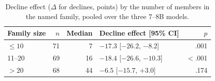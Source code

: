 \begin{table}[t]
\centering
\footnotesize
\setlength{\tabcolsep}{3pt}
\begin{tabular}{@{}lrrlr@{}}
\toprule
Family size & $n$ & Median & Decline effect [95\% CI] & $p$ \\
\midrule
$\le 10$ & 71 & 7 & $-17.3$ [$-26.2$, $-8.2$] & .001 \\
11--20 & 69 & 16 & $-18.4$ [$-26.6$, $-10.3$] & $<$.001 \\
$>20$ & 68 & 44 & $-6.5$ [$-15.7$, $+3.0$] & .174 \\
\bottomrule
\end{tabular}
\caption{Decline effect ($\Delta$ for declines, points) by the number of members in the named family, pooled over the three 7--8B models.}
\label{tab:famsize}
\end{table}
